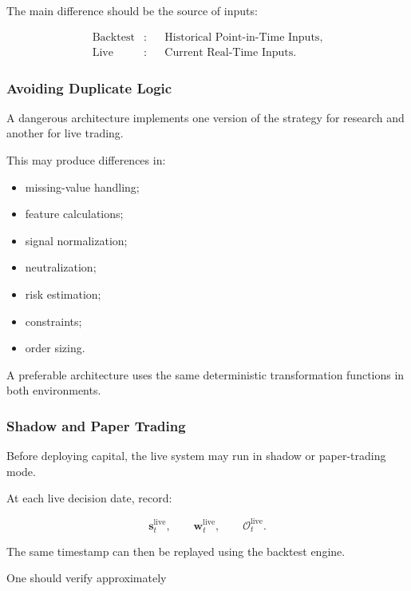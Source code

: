 \documentclass[11pt,a4paper]{article}
\begin{document}
The main difference should be the source of inputs:

\begin{equation}
\boxed{
\begin{aligned}
\text{Backtest}
&:
&&
\text{Historical Point-in-Time Inputs},
\\
\text{Live}
&:
&&
\text{Current Real-Time Inputs}.
\end{aligned}
}
\end{equation}


\subsubsection{Avoiding Duplicate Logic}

A dangerous architecture implements one version of the strategy for research
and another for live trading.

This may produce differences in:

\begin{itemize}
    \item missing-value handling;
    \item feature calculations;
    \item signal normalization;
    \item neutralization;
    \item risk estimation;
    \item constraints;
    \item order sizing.
\end{itemize}

A preferable architecture uses the same deterministic transformation functions
in both environments.


\subsubsection{Shadow and Paper Trading}

Before deploying capital, the live system may run in shadow or paper-trading
mode.

At each live decision date, record:

\begin{equation}
\boxed{
\mathbf{s}_t^{\mathrm{live}},
\qquad
\mathbf{w}_t^{\mathrm{live}},
\qquad
\mathcal{O}_t^{\mathrm{live}}.
}
\end{equation}

The same timestamp can then be replayed using the backtest engine.

One should verify approximately
\end{document}

